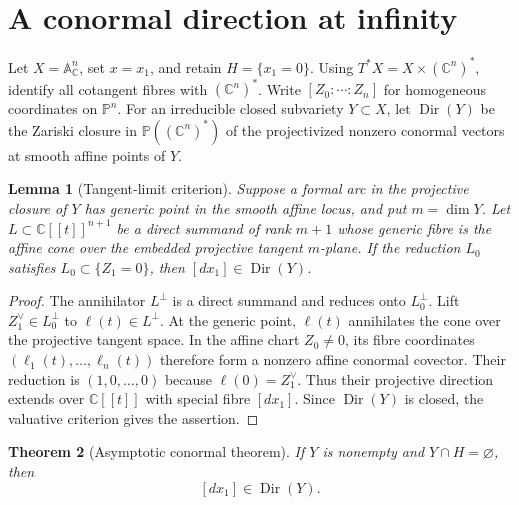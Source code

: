 \documentclass[11pt]{amsart}
\newtheorem{theorem}{Theorem}[section]
\newtheorem{lemma}[theorem]{Lemma}
\theoremstyle{definition}
\begin{document}
\section{A conormal direction at infinity}

Let $X=\mathbb A^n_{\mathbb C}$, set $x=x_1$, and retain $H=\{x_1=0\}$. Using
$T^*X=X\times(\mathbb C^n)^*$, identify all cotangent fibres with
$(\mathbb C^n)^*$. Write $[Z_0:\cdots:Z_n]$ for homogeneous coordinates on
$\mathbb P^n$. For an
irreducible closed subvariety $Y\subset X$, let $\operatorname{Dir}(Y)$ be the
Zariski closure in $\mathbb P((\mathbb C^n)^*)$ of the projectivized nonzero
conormal vectors at smooth affine points of $Y$.

\begin{lemma}[Tangent-limit criterion]\label{lem:tangent-limit}
Suppose a formal arc in the projective closure of $Y$ has generic point in the
smooth affine locus, and put $m=\dim Y$. Let
$L\subset\mathbb C[[t]]^{n+1}$ be a direct summand of rank $m+1$ whose generic
fibre is the affine cone over the embedded projective tangent $m$-plane. If
the reduction $L_0$ satisfies $L_0\subset\{Z_1=0\}$, then
$[dx_1]\in\operatorname{Dir}(Y)$.
\end{lemma}

\begin{proof}
The annihilator $L^\perp$ is a direct summand and reduces onto $L_0^\perp$.
Lift $Z_1^\vee\in L_0^\perp$ to $\ell(t)\in L^\perp$. At the generic point,
$\ell(t)$ annihilates the cone over the projective tangent space. In the
affine chart $Z_0\ne0$, its fibre coordinates
$(\ell_1(t),\ldots,\ell_n(t))$ therefore form a nonzero affine conormal
covector. Their reduction is $(1,0,\ldots,0)$ because
$\ell(0)=Z_1^\vee$. Thus their projective direction extends over
$\mathbb C[[t]]$ with special fibre $[dx_1]$. Since
$\operatorname{Dir}(Y)$ is closed, the valuative criterion gives the assertion.
\end{proof}

\begin{theorem}[Asymptotic conormal theorem]\label{thm:asymptotic-conormal}
If $Y$ is nonempty and $Y\cap H=\varnothing$, then
\[
 [dx_1]\in\operatorname{Dir}(Y).
\]
\end{theorem}
\end{document}
